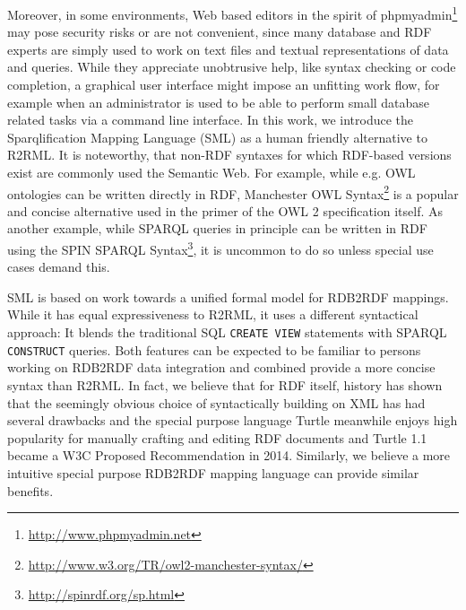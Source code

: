 Moreover, in some environments, Web based editors in the spirit of phpmyadmin\footnote{\url{http://www.phpmyadmin.net}} may pose security risks or are not convenient, since many database and RDF experts are simply used to work on text files and textual representations of data and queries.
While they appreciate unobtrusive help, like syntax checking or code completion, a graphical user interface might impose an unfitting work flow, for example when an administrator is used to be able to perform small database related tasks via a command line interface.
In this work, we introduce the Sparqlification Mapping Language (SML) as a human friendly alternative to R2RML.
It is noteworthy, that non-RDF syntaxes for which RDF-based versions exist are commonly used the Semantic Web.
For example, while e.g. OWL ontologies can be written directly in RDF, Manchester OWL Syntax\footnote{\url{http://www.w3.org/TR/owl2-manchester-syntax/}} is a popular and concise alternative used in the primer of the OWL 2 specification itself.
As another example, while SPARQL queries in principle can be written in RDF using the SPIN SPARQL Syntax\footnote{\url{http://spinrdf.org/sp.html}}, it is uncommon to do so unless special use cases demand this.

SML is based on work towards a unified formal model for RDB2RDF mappings.
While it has equal expressiveness to R2RML, it uses a different syntactical approach:
It blends the traditional SQL \texttt{CREATE VIEW} statements with SPARQL \texttt{CONSTRUCT} queries.
Both features can be expected to be familiar to persons working on RDB2RDF data integration and combined provide a more concise syntax than R2RML.
In fact, we believe that for RDF itself, history has shown that the seemingly obvious choice of syntactically building on XML has had several drawbacks and the special purpose language Turtle meanwhile enjoys high popularity for manually crafting and editing RDF documents and Turtle 1.1 became a W3C Proposed Recommendation in 2014.
Similarly, we believe a more intuitive special purpose RDB2RDF mapping language can provide similar benefits.

